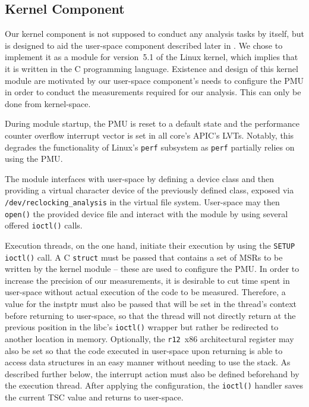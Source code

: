\subsection{Kernel Component}
\label{sec:analysis:design:kernel}

Our kernel component is not supposed to conduct any analysis tasks by itself, but is designed to aid the user-space component described later in . We chose to implement it as a module for version~5.1 of the Linux kernel, which implies that it is written in the C programming language. Existence and design of this kernel module are motivated by our user-space component's needs to configure the \gls{PMU} in order to conduct the measurements required for our analysis. This can only be done from kernel-space.

During module startup, the \gls{PMU} is reset to a default state and the performance counter overflow interrupt vector is set in all core's \gls{APIC}'s \glspl{LVT}. Notably, this degrades the functionality of Linux's \texttt{perf} subsystem as \texttt{perf} partially relies on using the \gls{PMU}.

The module interfaces with user-space by defining a device class and then providing a virtual character device of the previously defined class, exposed via \texttt{/dev/reclocking\_analysis} in the virtual file system. User-space may then \texttt{open()} the provided device file and interact with the module by using several offered \texttt{ioctl()} calls.

Execution threads, on the one hand, initiate their execution by using the \texttt{SETUP ioctl()} call. A C \texttt{struct} must be passed that contains a set of \glspl{MSR} to be written by the kernel module -- these are used to configure the \gls{PMU}. In order to increase the precision of our measurements, it is desirable to cut time spent in user-space without actual execution of the code to be measured. Therefore, a value for the \gls{instptr} must also be passed that will be set in the thread's context before returning to user-space, so that the thread will not directly return at the previous position in the \gls{libc}'s \texttt{ioctl()} wrapper but rather be redirected to another location in memory. Optionally, the \texttt{r12}~x86 architectural register may also be set so that the code executed in user-space upon returning is able to access data structures in an easy manner without needing to use the stack. As described further below, the interrupt action must also be defined beforehand by the execution thread. After applying the configuration, the \texttt{ioctl()} handler saves the current \gls{TSC} value and returns to user-space.

